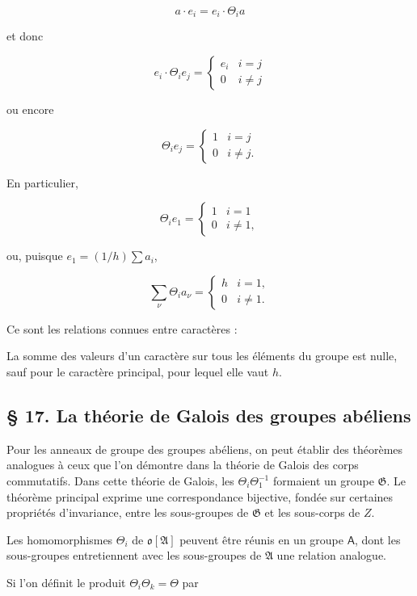 \[a \cdot e_i = e_i \cdot \Theta_i a\]

et donc

\[e_i \cdot \Theta_i e_j = \begin{cases} e_i & i = j \\ 0 & i \neq j \end{cases}\]

ou encore

\[\Theta_i e_j = \begin{cases} 1 & i = j \\ 0 & i \neq j. \end{cases}\]

En particulier,

\[\Theta_i e_1 = \begin{cases} 1 & i = 1 \\ 0 & i \neq 1, \end{cases}\]

ou, puisque \(e_1 = (1/h) \sum a_i\),

\[
\sum_\nu \Theta_i a_\nu=\begin{cases} h & i=1,\\ 0 & i\ne 1. \end{cases}
\]

Ce sont les relations connues entre caractères :

La somme des valeurs d'un caractère sur tous les éléments du groupe est nulle, sauf pour le caractère principal, pour lequel elle vaut \(h\).

\subsection*{\S{} 17. La théorie de Galois des groupes abéliens}\label{fr-r823-theorie-galois-groupes-abeliens}

Pour les anneaux de groupe des groupes abéliens, on peut établir des théorèmes analogues à ceux que l'on démontre dans la théorie de Galois des corps commutatifs. Dans cette théorie de Galois, les \(\Theta_i\Theta_1^{-1}\) formaient un groupe \(\mathfrak G\). Le théorème principal exprime une correspondance bijective, fondée sur certaines propriétés d'invariance, entre les sous-groupes de \(\mathfrak G\) et les sous-corps de \(Z\).

Les homomorphismes \(\Theta_i\) de \(\mathfrak o[\mathfrak A]\) peuvent être réunis en un groupe \(\mathsf A\), dont les sous-groupes entretiennent avec les sous-groupes de \(\mathfrak A\) une relation analogue.

Si l'on définit le produit \(\Theta_i \Theta_k = \Theta\) par

